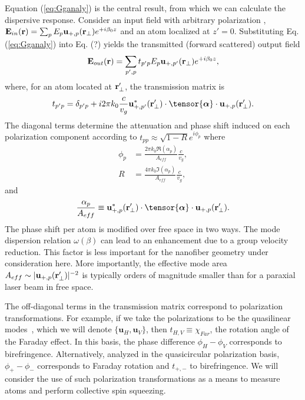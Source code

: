 \documentclass[preprint,aps,pra,onecolumn]{revtex4-1} %
\begin{document}
Equation (\ref{eq:Gganaly}) is the central result, from which we can calculate the dispersive response.  Consider an input field with arbitrary polarization , $\mathbf{E}_{in}(\mathbf{r}) = \sum_p E_p \mathbf{u}_{+,p}(\mathbf{r}_\perp) e^{+i \beta_0 z}$ and an atom localized at $z'=0$.  Substituting Eq. (\ref{eq:Gganaly}) into Eq. (?) yields the transmitted (forward scattered) output field 
\begin{equation}
\mathbf{E}_{out}(\mathbf{r}) =  \sum_{p',p} t_{p'p} E_p \mathbf{u}_{+, p'}(\mathbf{r}_\perp) e^{+i \beta_0 z}, 
\end{equation}
where, for an atom located at $\mathbf{r}'_\perp$, the transmission matrix is
\begin{equation}
t_{p' p} = \delta_{p' p} + i 2\pi k_0 \frac{c}{v_g}\mathbf{u}^*_{+, p'}(\br'_\perp) \cdot \tensor{\boldsymbol{\alpha}} \cdot \mathbf{u}_{+, p}(\br'_\perp) .
\end{equation}
The diagonal terms determine the attenuation and phase shift induced on each polarization component according to $t_{p p} \approx \sqrt{1-R}e^{i \phi_p}$ where
\begin{align}
\phi_p &= \frac{2 \pi k_0 \Re(\alpha_p) }{A_{eff}} \frac{c}{v_g}, \\
R &=  \frac{4 \pi k_0 \Im(\alpha_p) }{A_{eff}} \frac{c}{v_g},
\label{phaseshift} 
\end{align}
and 
\begin{equation}
 \frac{\alpha_p}{A_{eff}} \equiv \mathbf{u}^*_{+,p}(\br'_\perp) \cdot \tensor{\boldsymbol{\alpha}}\cdot \mathbf{u}_{+, p}(\br'_\perp). 
 \end{equation}
 The phase shift per atom is modified over free space in two ways.  The mode dispersion relation $\omega(\beta)$ can lead to an enhancement due to a group velocity reduction. This factor is less important for the nanofiber geometry under consideration here.  More importantly, the effective mode area $A_{eff} \sim |\mathbf{u}_{+,p}(\mathbf{r}'_\perp)|^{-2}$ is typically orders of magnitude smaller than for a paraxial laser beam in free space.  
 
 The off-diagonal terms in the transmission matrix correspond to polarization transformations.  For example, if we take the polarizations to be the quasilinear modes~\cite{?}, which we will denote $\{ \mathbf{u}_{H}, \mathbf{u}_{V}\}$, then $t_{H,V} \equiv \chi_{Far}$,  the rotation angle of the Faraday effect.  In this basis, the phase difference $\phi_H - \phi_V$ corresponds to birefringence.  Alternatively, analyzed in the quasicircular polarization basis, $\phi_+ - \phi_-$ corresponds to Faraday rotation and $t_{+,-}$ to birefringence.  We will consider the use of such polarization transformations as a means to measure atoms and perform collective spin squeezing.
\end{document}

